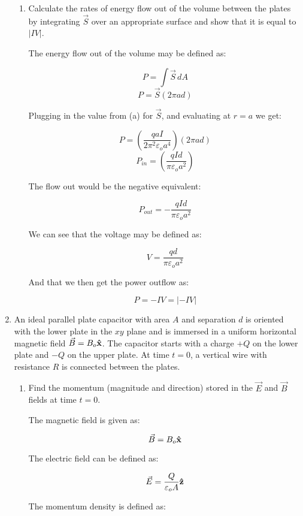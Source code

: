 \begin{enumerate}
\begin{enumerate}
      \item Calculate the rates of energy flow out of the volume between the plates by integrating $\vec{S}$ over an appropriate surface and show that it is equal to $|IV|$.

        The energy flow out of the volume may be defined as:

        $$P=\int \vec{S}\,dA$$
        $$P=\vec{S}(2\pi a d)$$

        Plugging in the value from (a) for $\vec{S}$, and evaluating at $r=a$ we get:

        $$P=\left( \frac{qaI}{2\pi^2\varepsilon_o a^4} \right)\left( 2\pi ad \right)$$
        $$P_{in}=\left( \frac{qId}{\pi\varepsilon_o a^2} \right)$$

        The flow out would be the negative equivalent:

        $$\boxed{P_{out}=-\frac{qId}{\pi\varepsilon_o a^2}}$$

        We can see that the voltage may be defined as:

        $$V=\frac{qd}{\pi\varepsilon_o a^2}$$

        And that we then get the power outflow as:

        $$P=-IV=|-IV|$$

    \end{enumerate}

  \item An ideal parallel plate capacitor with area $A$ and separation $d$ is oriented with the lower plate in the $xy$ plane and is immersed in a uniform horizontal magnetic field $\vec{B}=B_o\bold{\hat{x}}$. The capacitor starts with a charge $+Q$ on the lower plate and $−Q$ on the upper plate. At time $t=0$, a vertical wire with resistance $R$ is connected between the plates.

    \begin{enumerate}

      \item Find the momentum (magnitude and direction) stored in the $\vec{E}$ and $\vec{B}$ fields at time $t=0$.

        The magnetic field is given as:

        $$\vec{B}=B_o\bold{\hat{x}}$$

        The electric field can be defined as:

        $$\vec{E}=\frac{Q}{\varepsilon_o A}\bold{\hat{z}}$$

        The momentum density is defined as:


\end{enumerate}
\end{enumerate}
